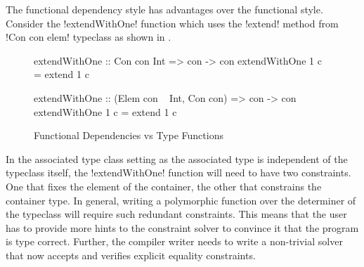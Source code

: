 \documentclass[screen,nonacm,manuscript,review]{acmart} %
\begin{document}
The functional dependency style has advantages over the
functional style\cite{jones_language_2008}. Consider the !extendWithOne!
function which uses the !extend! method from !Con con elem!
typeclass as shown in .
\begin{figure}[ht]
\centering
\begin{minipage}{0.5\linewidth}
\begin{code}
       extendWithOne :: Con con Int
                     => con -> con
       extendWithOne 1 c = extend 1 c
\end{code}
\end{minipage}%
\begin{minipage}{0.5\linewidth}
\begin{code}
      extendWithOne :: (Elem con ~ Int, Con con)
                    => con -> con
      extendWithOne 1 c = extend 1 c
\end{code}
\end{minipage}
\caption[FundDeps or TFs]{Functional Dependencies vs Type Functions}
\label{fig:fundeps-vs-tfs}
\end{figure}

In the associated type class setting as the associated type is
independent of the typeclass itself, the !extendWithOne! function will
need to have two constraints. One that fixes the element of the
container, the other that constrains the container type.
In general, writing a polymorphic function over the
determiner of the typeclass will require such redundant
constraints. This means that the user has to provide more hints to the
constraint solver to convince it that the program is type correct.
Further, the compiler writer needs to write a non-trivial solver that
now accepts and verifies explicit equality constraints.
\end{document}
